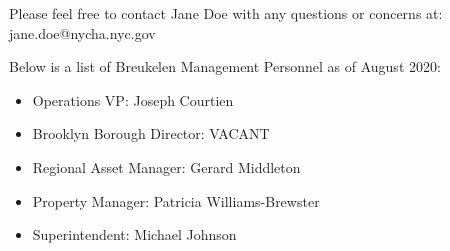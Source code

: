 {    Please feel free to contact Jane Doe with any questions or concerns at: jane.doe@nycha.nyc.gov

    Below is a list of Breukelen Management Personnel as of August 2020:
    \begin{itemize}
    \item Operations VP: Joseph Courtien
    \item Brooklyn Borough Director: VACANT
    \item Regional Asset Manager: Gerard Middleton
    \item Property Manager: Patricia Williams-Brewster
    \item Superintendent: Michael Johnson
    \end{itemize}
    }